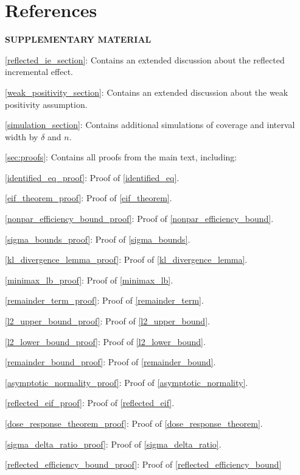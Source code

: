 \documentclass[11pt,twoside]{article}
\theoremstyle{definition}
\theoremstyle{remark}
\begin{document}
\bigskip

\section*{References}
\vspace{-1cm}




\begin{center}
{\large\bf SUPPLEMENTARY MATERIAL}
\end{center}

\begin{description}

\item \cref{reflected_ie_section}: Contains an extended discussion about the reflected incremental effect.
\item \cref{weak_positivity_section}: Contains an extended discussion about the weak positivity assumption.
\item \cref{simulation_section}: Contains additional simulations of coverage and interval width by $\delta$ and $n$.

\item \cref{sec:proofs}: Contains all proofs from the main text, including:
\begin{description}
    \item \cref{identified_eq_proof}: Proof of \cref{identified_eq}.
    \item \cref{eif_theorem_proof}: Proof of \cref{eif_theorem}.
    \item \cref{nonpar_efficiency_bound_proof}: Proof of \cref{nonpar_efficiency_bound}.
    \item \cref{sigma_bounds_proof}: Proof of \cref{sigma_bounds}.
    \item \cref{kl_divergence_lemma_proof}: Proof of \cref{kl_divergence_lemma}.
    \item \cref{minimax_lb_proof}: Proof of \cref{minimax_lb}.
    \item \cref{remainder_term_proof}: Proof of \cref{remainder_term}.
    \item \cref{l2_upper_bound_proof}: Proof of \cref{l2_upper_bound}.
    \item \cref{l2_lower_bound_proof}: Proof of \cref{l2_lower_bound}.
    \item \cref{remainder_bound_proof}: Proof of \cref{remainder_bound}.
    \item \cref{asymptotic_normality_proof}: Proof of \cref{asymptotic_normality}.
    \item \cref{reflected_eif_proof}: Proof of \cref{reflected_eif}.
    \item \cref{dose_response_theorem_proof}: Proof of \cref{dose_response_theorem}.
    \item \cref{sigma_delta_ratio_proof}: Proof of \cref{sigma_delta_ratio}.
    \item \cref{reflected_efficiency_bound_proof}: Proof of \cref{reflected_efficiency_bound}
\end{description}
\end{description}
\end{document}

